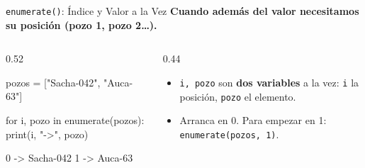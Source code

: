 \documentclass[aspectratio=169, 11pt]{beamer}
\begin{document}
\begin{frame}[fragile,shrink=10]{\texttt{enumerate()}: Índice y Valor a la Vez}
  \vspace{-4pt}
  {\small\color{arcaDark}\bfseries
    Cuando además del valor necesitamos su \textbf{posición} (pozo 1, pozo 2\ldots).}

  \vspace{5pt}
  \begin{columns}[T]
    \begin{column}{0.52\textwidth}
      \begin{pyblock}
pozos = ["Sacha-042", "Auca-63"]

for i, pozo in enumerate(pozos):
    print(i, "->", pozo)
      \end{pyblock}
      \vspace{2pt}
      \begin{outputblock}
0 -> Sacha-042
1 -> Auca-63
      \end{outputblock}
    \end{column}

    \begin{column}{0.44\textwidth}
      {\scriptsize\color{textMuted}
      \begin{itemize}\setlength{\itemsep}{5pt}
        \item[{\color{arcaRed}\scriptsize\faArrowRight}]
          \texttt{i, pozo} son \textbf{dos variables}
          a la vez: \texttt{i} la posición,
          \texttt{pozo} el elemento.
        \item[{\color{arcaRed}\scriptsize\faArrowRight}]
          Arranca en 0. Para empezar en 1:
          \texttt{enumerate(pozos, 1)}.
      \end{itemize}
      }
    \end{column}
  \end{columns}
\end{frame}
\end{document}
